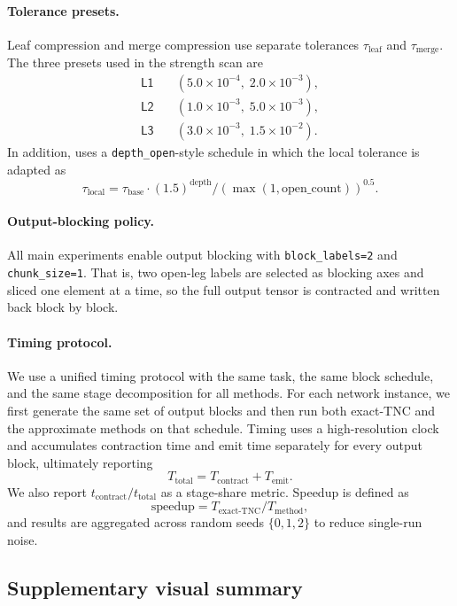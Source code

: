 \paragraph{Tolerance presets.}
Leaf compression and merge compression use separate tolerances $\tau_{\mathrm{leaf}}$ and $\tau_{\mathrm{merge}}$. The three presets used in the strength scan are
\[
\begin{aligned}
\textsf{L1} \quad &(5.0\times10^{-4},\;2.0\times10^{-3}),\\
\textsf{L2} \quad &(1.0\times10^{-3},\;5.0\times10^{-3}),\\
\textsf{L3} \quad &(3.0\times10^{-3},\;1.5\times10^{-2}).
\end{aligned}
\]
In addition, \method{} uses a \texttt{depth\_open}-style schedule in which the local tolerance is adapted as
\[
\tau_{\mathrm{local}}=\tau_{\mathrm{base}}\cdot(1.5)^{\mathrm{depth}}/(\max(1,\mathrm{open\_count}))^{0.5}.
\]

\paragraph{Output-blocking policy.}
All main experiments enable output blocking with \texttt{block\_labels=2} and \texttt{chunk\_size=1}. That is, two open-leg labels are selected as blocking axes and sliced one element at a time, so the full output tensor is contracted and written back block by block.

\paragraph{Timing protocol.}
We use a unified timing protocol with the same task, the same block schedule, and the same stage decomposition for all methods. For each network instance, we first generate the same set of output blocks and then run both \textsf{exact-TNC} and the approximate methods on that schedule. Timing uses a high-resolution clock and accumulates contraction time and emit time separately for every output block, ultimately reporting
\[
T_{\mathrm{total}}=T_{\mathrm{contract}}+T_{\mathrm{emit}}.
\]
We also report $t_{\mathrm{contract}}/t_{\mathrm{total}}$ as a stage-share metric. Speedup is defined as
\[
\mathrm{speedup}=T_{\mathrm{exact\text{-}TNC}}/T_{\mathrm{method}},
\]
and results are aggregated across random seeds $\{0,1,2\}$ to reduce single-run noise.

\subsection{Supplementary visual summary}

